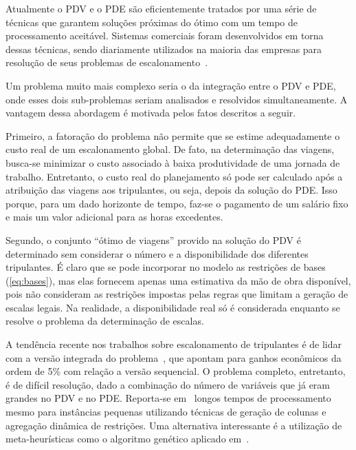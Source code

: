 \documentclass[12pt,a4paper]{article}
\begin{document}
Atualmente o PDV e o PDE são eficientemente tratados por uma série de técnicas que garantem soluções
próximas do ótimo com um tempo de processamento aceitável. Sistemas comerciais foram desenvolvidos
em torna dessas técnicas, sendo diariamente utilizados na maioria das empresas para resolução de
seus problemas de escalonamento~\cite{gopalakrishnan05}.

Um problema muito mais complexo seria o da integração entre o PDV e PDE, onde esses dois
sub-problemas seriam analisados e resolvidos simultaneamente. A vantagem dessa abordagem é motivada
pelos fatos descritos a seguir.

Primeiro, a fatoração do problema não permite que se estime adequadamente o custo
real de um escalonamento global. De fato, na determinação das viagens, busca-se minimizar o custo
associado à baixa produtividade de uma jornada de trabalho. Entretanto, o custo real do planejamento
só pode ser calculado após a atribuição das viagens aos tripulantes, ou seja, depois da solução do
PDE. Isso porque, para um dado horizonte de tempo, faz-se o pagamento de um salário fixo e mais 
um valor adicional para as horas excedentes.

Segundo, o conjunto ``ótimo de viagens'' provido na solução do PDV é determinado sem considerar o
número e a disponibilidade dos diferentes tripulantes. É claro que se pode incorporar no modelo as
restrições de bases (\ref{eq:bases}), mas elas fornecem apenas uma estimativa da mão de obra
disponível, pois não consideram as restrições impostas pelas regras que limitam a geração de escalas
legais. Na realidade, a disponibilidade real só é considerada enquanto se resolve o problema da
determinação de escalas.

A tendência recente nos trabalhos sobre escalonamento de tripulantes é de lidar com a versão
integrada do problema~\cite{saddoune12, souai09}, que apontam para ganhos econômicos da ordem de 5\%
com relação a versão sequencial. O problema completo, entretanto, é de difícil resolução, dado a
combinação do número de variáveis que já eram grandes no PDV e no PDE. Reporta-se
em~\cite{saddoune12} longos tempos de processamento mesmo para instâncias pequenas utilizando
técnicas de geração de colunas e agregação dinâmica de restrições. Uma alternativa interessante é a
utilização de meta-heurísticas como o algoritmo genético aplicado em~\cite{souai09}.

\end{document}
